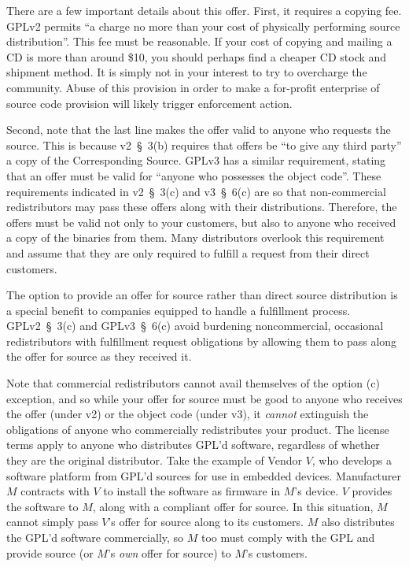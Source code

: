 There are a few important details about this offer.  First, it requires a
copying fee.  GPLv2 permits ``a charge no more than your cost of
physically performing source distribution''.  This fee must be reasonable.
If your cost of copying and mailing a CD is more than around \$10, you
should perhaps find a cheaper CD stock and shipment method.  It is simply
not in your interest to try to overcharge the community.  Abuse of this
provision in order to make a for-profit enterprise of source code
provision will likely trigger enforcement action.

Second, note that the last line makes the offer valid to anyone who
requests the source.  This is because v2~\S~3(b) requires that offers be
``to give any third party'' a copy of the Corresponding Source.  GPLv3 has
a similar requirement, stating that an offer must be valid for ``anyone
who possesses the object code''.  These requirements indicated in
v2~\S~3(c) and v3~\S~6(c) are so that non-commercial redistributors may
pass these offers along with their distributions.  Therefore, the offers
must be valid not only to your customers, but also to anyone who received
a copy of the binaries from them.  Many distributors overlook this
requirement and assume that they are only required to fulfill a request
from their direct customers.

The option to provide an offer for source rather than direct source
distribution is a special benefit to companies equipped to handle a
fulfillment process.  GPLv2~\S~3(c) and GPLv3~\S~6(c) avoid burdening
noncommercial, occasional redistributors with fulfillment request
obligations by allowing them to pass along the offer for source as they
received it.

Note that commercial redistributors cannot avail themselves of the option
(c) exception, and so while your offer for source must be good to anyone
who receives the offer (under v2) or the object code (under v3), it
\emph{cannot} extinguish the obligations of anyone who commercially
redistributes your product.  The license terms apply to anyone who
distributes GPL'd software, regardless of whether they are the original
distributor.  Take the example of Vendor $V$, who develops a software
platform from GPL'd sources for use in embedded devices.  Manufacturer $M$
contracts with $V$ to install the software as firmware in $M$'s device.
$V$ provides the software to $M$, along with a compliant offer for source.
In this situation, $M$ cannot simply pass $V$'s offer for source along to
its customers.  $M$ also distributes the GPL'd software commercially, so
$M$ too must comply with the GPL and provide source (or $M$'s \emph{own}
offer for source) to $M$'s customers.

